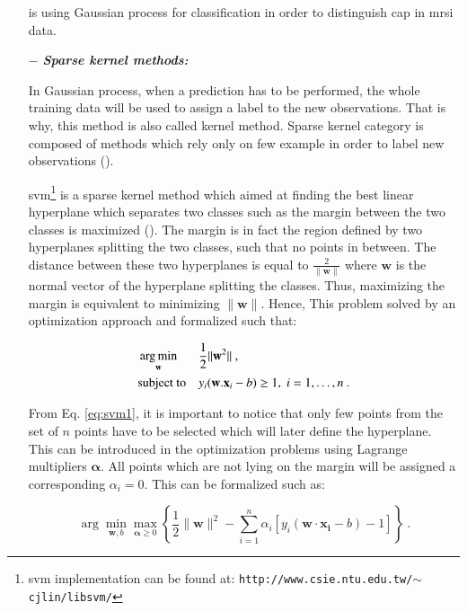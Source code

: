 \begin{enumerate}[leftmargin=*]
\cite{Kelm2007} is using Gaussian process for classification in order to distinguish \ac{cap} in \ac{mrsi} data.

\item[$-$] \textbf{\textit{Sparse kernel methods:}}

In Gaussian process, when a prediction has to be performed, the whole training data will be used to assign a label to the new observations. That is why, this method is also called kernel method. Sparse kernel category is composed of methods which rely only on few example in order to label new observations (\cite{Bishop2006}).

\Acf{svm}\footnote{\ac{svm} implementation can be found at: \texttt{http://www.csie.ntu.edu.tw/$\sim$cjlin/libsvm/}} is a sparse kernel method which aimed at finding the best linear hyperplane which separates two classes such as the margin between the two classes is maximized (\cite{Vapnik1963}). The margin is in fact the region defined by two hyperplanes splitting the two classes, such that no points in between. The distance between these two hyperplanes is equal to $\frac{2}{\|\mathbf{w}\|}$ where $\mathbf{w}$ is the normal vector of the hyperplane splitting the classes. Thus, maximizing the margin is equivalent to minimizing $\|\mathbf{w}\|$. Hence, This problem solved by an optimization approach and formalized such that:

\begin{equation}
\begin{aligned}
& \operatorname*{arg\,min}_{\mathbf{w}}
& & \frac{1}{2} \| \mathbf{w}^2\| \ , \\
& \text{subject to}
& & y_i(\mathbf{w}.\mathbf{x}_i - b) \geq 1, \; i = 1, \ldots, n \ .
\end{aligned}
\label{eq:svm1}
\end{equation}

From Eq. \ref{eq:svm1}, it is important to notice that only few points from the set of $n$ points have to be selected which will later define the hyperplane. This can be introduced in the optimization problems using Lagrange multipliers $\boldsymbol{\alpha}$. All points which are not lying on the margin will be assigned a corresponding $\alpha_i = 0$. This can be formalized such as:

\begin{equation}
	\arg\min_{\mathbf{w},b } \max_{\boldsymbol{\alpha}\geq 0 } \left\{ \frac{1}{2}\|\mathbf{w}\|^2 - \sum_{i=1}^{n}{\alpha_i[y_i(\mathbf{w}\cdot \mathbf{x_i} - b)-1]} \right\} \ .
	\label{eq:svm2}
\end{equation}


\end{enumerate}
